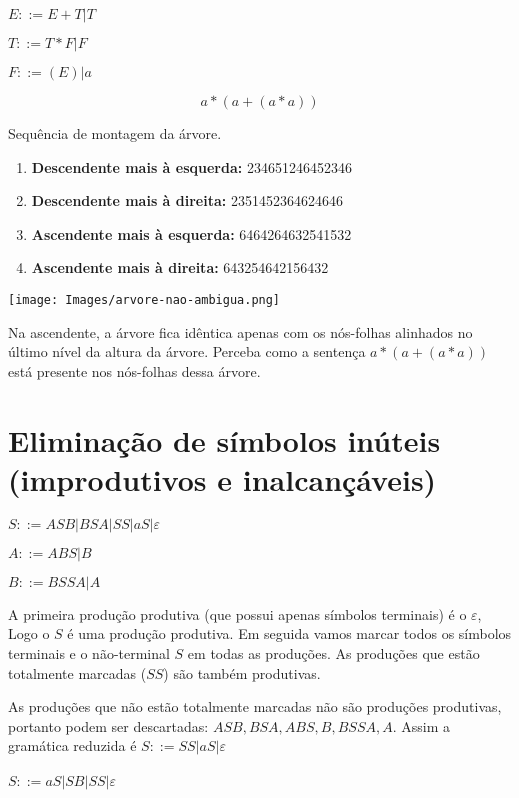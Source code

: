 \documentclass[]{article}
\begin{document}
		$E::= E+T | T$
		
		$T::= T*F | F$

		$F::= (E)| a$

		
		$$a*(a+ (a*a))$$
		
		Sequência de montagem da árvore.
		\begin{enumerate}
			\item \textbf{Descendente mais à esquerda:} 234651246452346
			\item \textbf{Descendente mais à direita:} 2351452364624646
			\item \textbf{Ascendente mais à esquerda:} 6464264632541532
			\item \textbf{Ascendente mais à direita:} 643254642156432
		\end{enumerate}
		\begin{minipage}[t]{0.43\textwidth}
		\texttt{[image: Images/arvore-nao-ambigua.png]}
		\end{minipage}
		\hfill
		\begin{minipage}[t]{0.43\textwidth}
		Na ascendente, a árvore fica idêntica apenas com os nós-folhas alinhados no último nível da altura da árvore. Perceba como a sentença $a*(a+(a*a))$ está presente nos nós-folhas dessa árvore.
		\end{minipage}
		\newpage
		
\section{Eliminação de símbolos inúteis (improdutivos e inalcançáveis)}

	$S::= ASB|BSA|SS|aS|\varepsilon$
	
	$A::= ABS | B$
	
	$B::= BSSA|A$
	
	A primeira produção produtiva (que possui apenas símbolos terminais) é o $\varepsilon $, Logo o $S$ é uma produção produtiva. Em seguida vamos marcar todos os símbolos terminais e o não-terminal $S$ em todas as produções. As produções que estão totalmente marcadas ($SS$) são também produtivas.
	
	As produções que não estão totalmente marcadas não são produções produtivas, portanto podem ser descartadas: $ASB, BSA, ABS, B, BSSA, A$. Assim a gramática reduzida é $S::= SS|aS|\varepsilon$
	\\ \\ 
	
	$S::= aS | SB | SS | \varepsilon$
	
\end{document}
